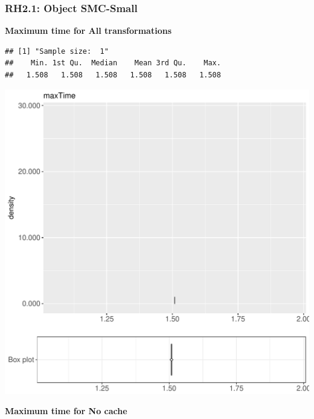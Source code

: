\documentclass{article}\usepackage[]{graphicx}\usepackage[]{color}
\makeatletter
\def\maxwidth{ %
  \ifdim\Gin@nat@width>\linewidth
    \linewidth
  \else
    \Gin@nat@width
  \fi
}
\newenvironment{kframe}{%
 \def\at@end@of@kframe{}%
 \ifinner\ifhmode%
  \def\at@end@of@kframe{\end{minipage}}%
  \begin{minipage}{\columnwidth}%
 \fi\fi%
 \def\FrameCommand##1{\hskip\@totalleftmargin \hskip-\fboxsep
 \colorbox{shadecolor}{##1}\hskip-\fboxsep
     \hskip-\linewidth \hskip-\@totalleftmargin \hskip\columnwidth}%
 \MakeFramed {\advance\hsize-\width
   \@totalleftmargin\z@ \linewidth\hsize
   \@setminipage}}%
 {\par\unskip\endMakeFramed%
 \at@end@of@kframe}
\newenvironment{knitrout}{}{} %
\makeatother
\begin{document}
\subsubsection{RH2.1: Object SMC-Small}

 \textbf{Maximum time for All transformations}
\begin{knitrout}
\color{fgcolor}\begin{kframe}
\begin{verbatim}
## [1] "Sample size:  1"
##    Min. 1st Qu.  Median    Mean 3rd Qu.    Max. 
##   1.508   1.508   1.508   1.508   1.508   1.508
\end{verbatim}


{\ttfamily\noindent\bfseries{}}\end{kframe}
\includegraphics[width=\maxwidth]{figure/RH2_cashew_small-1} 

\end{knitrout}
 \textbf{Maximum time for No cache}
\end{document}
